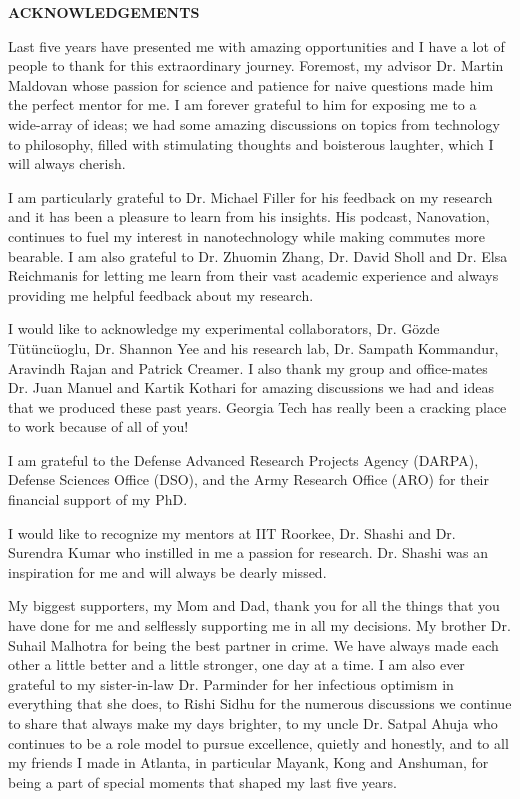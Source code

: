 \clearpage
\begin{centering}
\textbf{ACKNOWLEDGEMENTS}\\
\vspace{\baselineskip}
\end{centering}

Last five years have presented me with amazing opportunities and I have a lot of people to thank for this extraordinary journey. Foremost, my advisor Dr. Martin Maldovan whose passion for science and patience for naive questions made him the perfect mentor for me. I am forever grateful to him for exposing me to a wide-array of ideas; we had some amazing discussions on topics from technology to philosophy, filled with stimulating thoughts and boisterous laughter, which I will always cherish.

I am particularly grateful to Dr. Michael Filler for his feedback on my research and it has been a pleasure to learn from his insights. His podcast, Nanovation, continues to fuel my interest in nanotechnology while making commutes more bearable. I am also grateful to Dr. Zhuomin Zhang, Dr. David Sholl and Dr. Elsa Reichmanis for letting me learn from their vast academic experience and always providing me helpful feedback about my research. 

I would like to acknowledge my experimental collaborators, Dr. Gözde Tütüncüoglu, Dr. Shannon Yee and his research lab, Dr. Sampath Kommandur, Aravindh Rajan and Patrick Creamer. I also thank my group and office-mates Dr. Juan Manuel and Kartik Kothari for amazing discussions we had and ideas that we produced these past years. Georgia Tech has really been a cracking place to work because of all of you! 

I am grateful to the Defense Advanced Research Projects Agency (DARPA), Defense Sciences Office (DSO), and the Army Research Office (ARO) for their financial support of my PhD.

I would like to recognize my mentors at IIT Roorkee, Dr. Shashi and Dr. Surendra Kumar who instilled in me a passion for research. Dr. Shashi was an inspiration for me and will always be dearly missed.

My biggest supporters, my Mom and Dad, thank you for all the things that you have done for me and selflessly supporting me in all my decisions. My brother Dr. Suhail Malhotra for being the best partner in crime. We have always made each other a little better and a little stronger, one day at a time. I am also ever grateful to my sister-in-law Dr. Parminder for her infectious optimism in everything that she does, to Rishi Sidhu for the numerous discussions we continue to share that always make my days brighter, to my uncle Dr. Satpal Ahuja who continues to be a role model to pursue excellence, quietly and honestly, and to all my friends I made in Atlanta, in particular Mayank, Kong and Anshuman, for being a part of special moments that shaped my last five years. 

